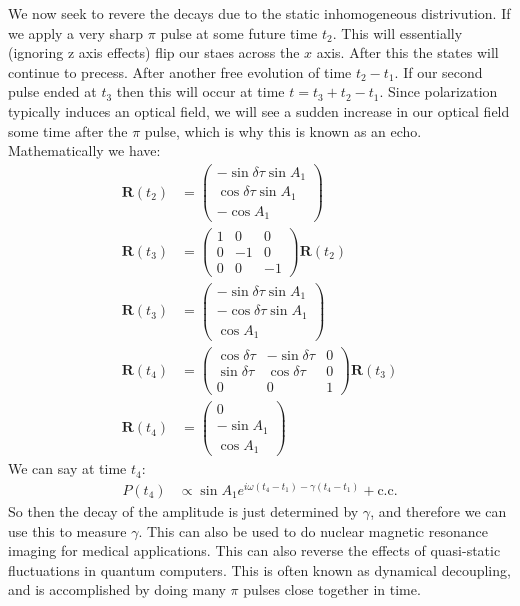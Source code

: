 We now seek to revere the decays due to the static inhomogeneous distrivution. If we apply a very sharp $\pi$ pulse at some future time $t_2$. This will essentially (ignoring z axis effects) flip our staes across the $x$ axis.
After this the states will continue to precess. After another free evolution of time $t_2 - t_1$. If our second pulse ended at $t_3$ then this will occur at time $t = t_3 + t_2 - t_1$.
Since polarization typically induces an optical field, we will see a sudden increase in our optical field some time after the $\pi$ pulse, which is why this is known as an echo.
Mathematically we have:
\begin{align*}
	\bm{R}(t_2) &= \begin{pmatrix}
		-\sin\delta\tau\sin A_1\\
		\cos\delta\tau\sin A_1 \\
		-\cos A_1
		       \end{pmatrix} \\
	\bm{R}(t_3) &= \begin{pmatrix}
		1 & 0 & 0 \\
		0 & -1 & 0 \\
		0 & 0 & -1
	\end{pmatrix}\bm{R}(t_2) \\
		\bm{R}(t_3) &= \begin{pmatrix}
			-\sin\delta\tau\sin A_1 \\
			-\cos\delta\tau \sin A_1 \\
			\cos A_1
			       \end{pmatrix} \\
	\bm{R}(t_4) &= \begin{pmatrix}
		\cos\delta\tau & -\sin\delta\tau & 0 \\
		\sin\delta\tau & \cos\delta\tau & 0 \\
		0 & 0 & 1
	\end{pmatrix}\bm{R}(t_3) \\
		\bm{R}(t_4) &= \begin{pmatrix}
			0 \\
			-\sin A_1 \\
			\cos A_1
			       \end{pmatrix}
\end{align*}
We can say at time $t_4$:
\begin{align*}
	P(t_4) &\propto \sin A_1 e^{i\omega (t_4 - t_1) - \gamma (t_4 - t_1)} + \text{c.c.}
\end{align*}
So then the decay of the amplitude is just determined by $\gamma$, and therefore we can use this to measure $\gamma$. This can also be used to do nuclear magnetic resonance imaging for medical applications.
This can also reverse the effects of quasi-static fluctuations in quantum computers. This is often known as dynamical decoupling, and is accomplished by doing many $\pi$ pulses close together in time.
